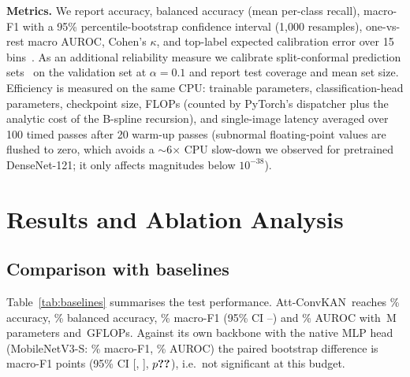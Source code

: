 \documentclass[conference]{IEEEtran}
\newcommand{\ours}{Att-ConvKAN}
\begin{document}
\textbf{Metrics.} We report accuracy, balanced accuracy (mean per-class recall), macro-F1 with a 95\% percentile-bootstrap confidence interval (1{,}000 resamples), one-vs-rest macro AUROC, Cohen's $\kappa$, and top-label expected calibration error over 15 bins~\cite{guo2017calibration}. As an additional reliability measure we calibrate split-conformal prediction sets~\cite{angelopoulos2021gentle} on the validation set at $\alpha=0.1$ and report test coverage and mean set size. Efficiency is measured on the same CPU: trainable parameters, classification-head parameters, checkpoint size, FLOPs (counted by PyTorch's dispatcher plus the analytic cost of the B-spline recursion), and single-image latency averaged over 100 timed passes after 20 warm-up passes (subnormal floating-point values are flushed to zero, which avoids a $\sim$6$\times$ CPU slow-down we observed for pretrained DenseNet-121; it only affects magnitudes below $10^{-38}$).

\section{Results and Ablation Analysis}


\subsection{Comparison with baselines}
Table~\ref{tab:baselines} summarises the test performance. \ours\ reaches \% accuracy, \% balanced accuracy, \% macro-F1 (95\% CI --) and \% AUROC with \,M parameters and \,GFLOPs. Against its own backbone with the native MLP head (MobileNetV3-S: \% macro-F1, \% AUROC) the paired bootstrap difference is  macro-F1 points (95\% CI [, ], $p\res{paired@mobilenetv3_small}{p_value}$), i.e.\ not significant at this budget.
\end{document}
